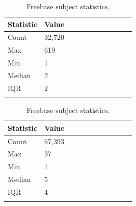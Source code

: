 \begin{table}[H]
	\parbox{.5\linewidth}{
		\centering
		\begin{tabular}{lllllllllll}
  			\textbf{Statistic} & \textbf{Value}  \\
  			\hline
			Count & 32,720 \\
			Max & 619 \\
			Min & 1 \\
  			Median & 2 \\
  			IQR & 2 \\
				&
		\end{tabular}
		\caption{WordNet subject statistics.}
		}
	\hfill
	\parbox{.5\linewidth}{
		\centering
		\begin{tabular}{lllllllllll}
  			\textbf{Statistic} & \textbf{Value}  \\
  			\hline
			Count & 67,393 \\
			Max & 37 \\
			Min & 1 \\
  			Median & 5 \\
  			IQR & 4 \\
				&
		\end{tabular}
		\caption{Freebase subject statistics.}
		}
\end{table}




